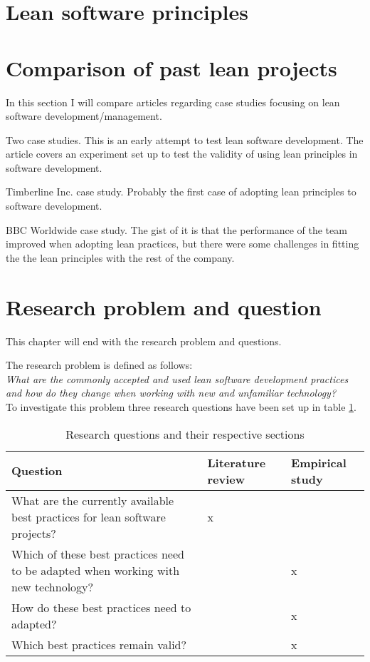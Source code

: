 \section{Lean software principles}
\label{section:leansoftwareprinciples}


\section{Comparison of past lean projects}
\label{section:pastleanprojects}

In this section I will compare articles regarding case studies focusing on lean software development/management.

Two case studies. This is an early attempt to test lean software development. The article covers an experiment set up to test the validity of using lean principles in software development. \cite{Middleton2001Lean}

Timberline Inc. case study. Probably the first case of adopting lean principles to software development.\cite{Middleton2005Lean}

BBC Worldwide case study. The gist of it is that the performance of the team improved when adopting lean practices, but there were some challenges in fitting the the lean principles with the rest of the company.\cite{Middleton2012Lean}


\section{Research problem and question}
\label{section:problem}

This chapter will end with the research problem and questions.

The research problem is defined as follows:\\

\textit{What are the commonly accepted and used lean software development practices and how do they change when working with new and unfamiliar technology?}\\

To investigate this problem three research questions have been set up in table \ref{tbl:questions}.


\begin{table}
  \begin{tabular}{p{200pt} | p{70pt} | p{70pt}}
    Question & Literature review & Empirical study \\
    \hline
    What are the currently available best practices for lean software projects? & x & \\
    Which of these best practices need to be adapted when working with new technology? &  & x \\
    How do these best practices need to adapted? &  & x \\
    Which best practices remain valid? &  & x \\
  \end{tabular}
  \caption{Research questions and their respective sections}
  \label{tbl:questions}
\end{table}